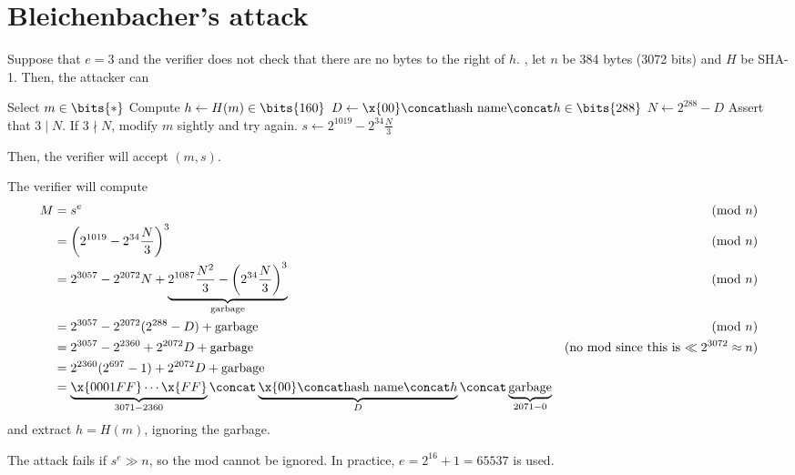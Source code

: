 \documentclass[class=co487,tikz,minted,notes]{agony}
\begin{document}
\section{Bleichenbacher's attack}
\begin{attack}[Bleichenbacher]
  Suppose that $e = 3$ and the verifier does not check that there are no bytes
  to the right of $h$.
  \WLOG, let $n$ be 384 bytes (3072 bits) and $H$ be SHA-1.
  Then, the attacker can
  \begin{algorithmic}[1]
    \State Select $m \in \bits{*}$
    \State Compute $h \gets H(m) \in \bits{160}$
    \State $D \gets \x{00} \concat \text{hash name} \concat h \in \bits{288}$
    \State $N \gets 2^{288} - D$
    \State Assert that $3 \mid N$. If $3 \nmid N$, modify $m$ sightly and try again.
    \State $s \gets 2^{1019} - 2^{34}\frac{N}{3}$
    \State {}
  \end{algorithmic}
  Then, the verifier will accept $(m,s)$.
\end{attack}
\begin{prf}
  The verifier will compute
  \begin{align*}
    M & = s^e                                                                                                                                                             & \pmod n                                                \\
      & = \qty(2^{1019} - 2^{34}\frac{N}{3})^3                                                                                                                            & \pmod n                                                \\
      & = 2^{3057} - 2^{2072}N + \underbrace{2^{1087}\frac{N^2}{3} - \qty(2^{34}\frac{N}{3})^3}_{\text{garbage}}                                                          & \pmod n                                                \\
      & = 2^{3057} - 2^{2072}(2^{288} - D) + \text{garbage}                                                                                                               & \pmod n                                                \\
      & = 2^{3057} - 2^{2360} + 2^{2072}D + \text{garbage}                                                                                                                & \text{(no mod since this is $\ll 2^{3072} \approx n$)} \\
      & = 2^{2360}(2^{697}-1) + 2^{2072}D + \text{garbage}                                                                                                                                                                         \\
      & = \underbrace{\x{0001FF}\cdots\x{FF}}_{3071-2360} \concat \underbrace{\x{00} \concat \text{hash name} \concat h}_{D} \concat \underbrace{\text{garbage}}_{2071-0}
  \end{align*}
  and extract $h = H(m)$, ignoring the garbage.
\end{prf}
The attack fails if $s^e \gg n$, so the mod cannot be ignored.
In practice, $e = 2^{16}+1 = 65537$ is used.
\end{document}

